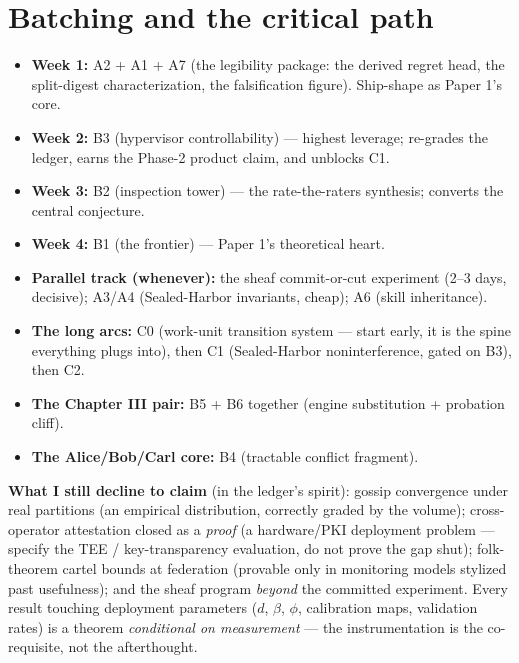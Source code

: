 \documentclass[11pt,a4paper]{article}
\begin{document}
\section{Batching and the critical path}
\begin{itemize}
\item \textbf{Week 1:} A2 + A1 + A7 (the legibility package: the derived regret head, the split-digest characterization, the falsification figure). Ship-shape as Paper 1's core.
\item \textbf{Week 2:} B3 (hypervisor controllability) --- highest leverage; re-grades the ledger, earns the Phase-2 product claim, and unblocks C1.
\item \textbf{Week 3:} B2 (inspection tower) --- the rate-the-raters synthesis; converts the central conjecture.
\item \textbf{Week 4:} B1 (the frontier) --- Paper 1's theoretical heart.
\item \textbf{Parallel track (whenever):} the sheaf commit-or-cut experiment (2--3 days, decisive); A3/A4 (Sealed-Harbor invariants, cheap); A6 (skill inheritance).
\item \textbf{The long arcs:} C0 (work-unit transition system --- start early, it is the spine everything plugs into), then C1 (Sealed-Harbor noninterference, gated on B3), then C2.
\item \textbf{The Chapter III pair:} B5 + B6 together (engine substitution + probation cliff).
\item \textbf{The Alice/Bob/Carl core:} B4 (tractable conflict fragment).
\end{itemize}

\noindent\textbf{What I still decline to claim} (in the ledger's spirit): gossip convergence under real partitions (an empirical distribution, correctly graded by the volume); cross-operator attestation closed as a \emph{proof} (a hardware/PKI deployment problem --- specify the TEE / key-transparency evaluation, do not prove the gap shut); folk-theorem cartel bounds at federation (provable only in monitoring models stylized past usefulness); and the sheaf program \emph{beyond} the committed experiment. Every result touching deployment parameters ($d$, $\beta$, $\phi$, calibration maps, validation rates) is a theorem \emph{conditional on measurement} --- the instrumentation is the co-requisite, not the afterthought.
\end{document}
